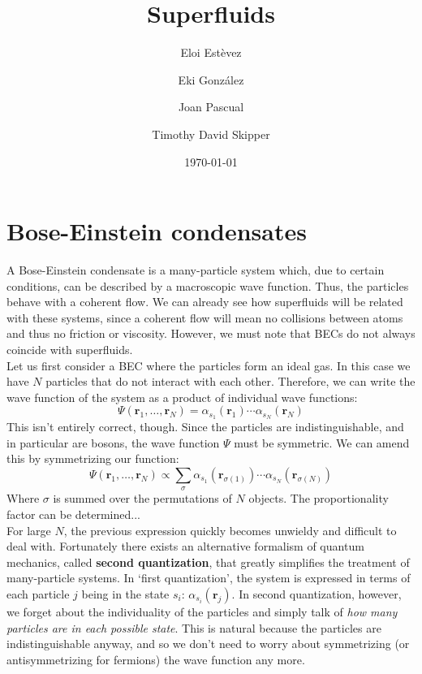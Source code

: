 \documentclass{article}
\title{Superfluids}
\author{Eloi Estèvez \and Eki González \and Joan Pascual \and Timothy David Skipper}
\date{\today}
\begin{document}
\maketitle
\begin{abstract}
\end{abstract}

\section{Bose-Einstein condensates}


A Bose-Einstein condensate is a many-particle system which, due to certain
conditions, can be described by a macroscopic wave function.  Thus, the particles
behave with a coherent flow.  We can already see how superfluids will be related
with these systems, since a coherent flow will mean no collisions between atoms
and thus no friction or viscosity.  However, we must note that BECs do not always
coincide with superfluids.
\\

Let us first consider a BEC where the particles form an ideal gas.  In this case we have $N$ particles that do not interact with each other.  Therefore, we can write the wave function of the system as a product of
individual wave functions:
\[\Psi(\mathbf{r}_1, \dots, \mathbf{r}_N) =
    \alpha_{s_1}(\mathbf{r}_1)\dotsb\alpha_{s_N}(\mathbf{r}_N)\]
This isn't entirely correct, though.  Since the particles are indistinguishable, and in particular are bosons, the wave function $\Psi$ must be symmetric.  We can amend this by symmetrizing our function:
\[\Psi(\mathbf{r}_1, \dots, \mathbf{r}_N) \propto \sum_{\sigma}
        \alpha_{s_1}(\mathbf{r}_{\sigma(1)})\dotsb
        \alpha_{s_N}(\mathbf{r}_{\sigma(N)})\]
Where $\sigma$ is summed over the permutations of $N$ objects.  The proportionality factor can be determined...
\\

For large $N$, the previous expression quickly becomes unwieldy and difficult to deal with.  Fortunately there exists an alternative formalism of quantum mechanics, called \textbf{second quantization}, that greatly simplifies the treatment of many-particle systems.  In `first quantization', the system is expressed in terms of each particle $j$ being in the state $s_i$: $\alpha_{s_i}(\mathbf{r}_j)$.  In second quantization, however, we forget about the individuality of the particles and simply talk of \textit{how many particles are in each possible state}.  This is natural because the particles are indistinguishable anyway, and so we don't need to worry about symmetrizing (or antisymmetrizing for fermions) the wave function any more.
\\
\end{document}
